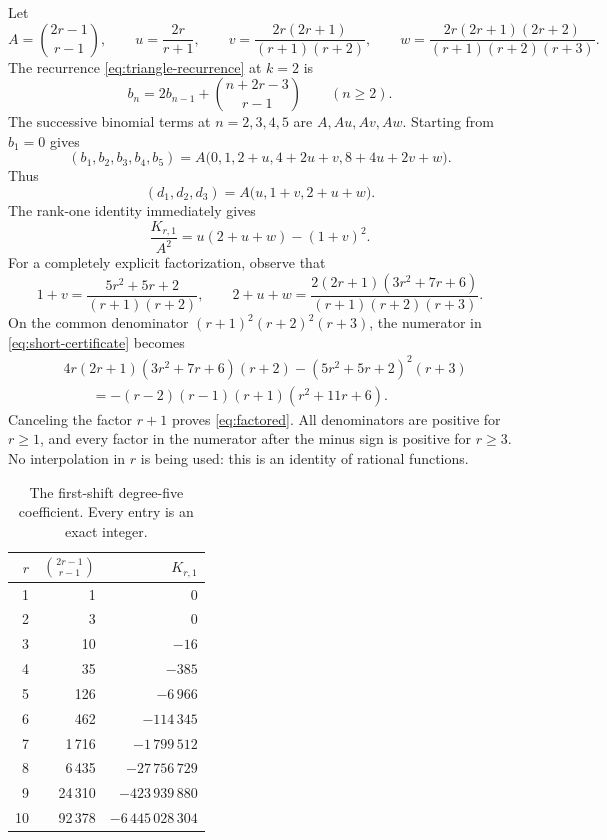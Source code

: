 \documentclass[11pt,a4paper]{article}
\theoremstyle{definition}
\numberwithin{equation}{section}
\begin{document}
Let
\[
 A=\binom{2r-1}{r-1},\qquad
 u=\frac{2r}{r+1},\qquad
 v=\frac{2r(2r+1)}{(r+1)(r+2)},\qquad
 w=\frac{2r(2r+1)(2r+2)}{(r+1)(r+2)(r+3)}.
\]
The recurrence \eqref{eq:triangle-recurrence} at $k=2$ is
\begin{equation}
 b_n=2b_{n-1}+\binom{n+2r-3}{r-1}\qquad(n\ge2).
 \label{eq:b-recur}
\end{equation}
The successive binomial terms at $n=2,3,4,5$ are $A,Au,Av,Aw$.
Starting from $b_1=0$ gives
\begin{equation}
 (b_1,b_2,b_3,b_4,b_5)
 =A\bigl(0,1,2+u,4+2u+v,8+4u+2v+w\bigr).
 \label{eq:first-b}
\end{equation}
Thus
\begin{equation}
 (d_1,d_2,d_3)=A\bigl(u,1+v,2+u+w\bigr).
 \label{eq:first-d}
\end{equation}
The rank-one identity immediately gives
\begin{equation}
 \frac{K_{r,1}}{A^2}=u(2+u+w)-(1+v)^2.
 \label{eq:short-certificate}
\end{equation}
For a completely explicit factorization, observe that
\[
 1+v=\frac{5r^2+5r+2}{(r+1)(r+2)},\qquad
 2+u+w=\frac{2(2r+1)(3r^2+7r+6)}{(r+1)(r+2)(r+3)}.
\]
On the common denominator $(r+1)^2(r+2)^2(r+3)$, the numerator in
\eqref{eq:short-certificate} becomes
\begin{align*}
 &4r(2r+1)(3r^2+7r+6)(r+2)-(5r^2+5r+2)^2(r+3)\\
 &\hspace{2em}=-(r-2)(r-1)(r+1)(r^2+11r+6).
\end{align*}
Canceling the factor $r+1$ proves \eqref{eq:factored}. All denominators
are positive for $r\ge1$, and every factor in the numerator after the
minus sign is positive for $r\ge3$. No interpolation in $r$ is being
used: this is an identity of rational functions.

\begin{table}[ht]
\centering
\caption{The first-shift degree-five coefficient. Every entry is an exact integer.}
\label{tab:K}
\begin{tabular}{@{}rrr@{}}
\toprule
$r$ & $\binom{2r-1}{r-1}$ & $K_{r,1}$\\
\midrule
1&1&0\\
2&3&0\\
3&10&$-16$\\
4&35&$-385$\\
5&126&$-6\,966$\\
6&462&$-114\,345$\\
7&1\,716&$-1\,799\,512$\\
8&6\,435&$-27\,756\,729$\\
9&24\,310&$-423\,939\,880$\\
10&92\,378&$-6\,445\,028\,304$\\
\bottomrule
\end{tabular}
\end{table}
\end{document}
